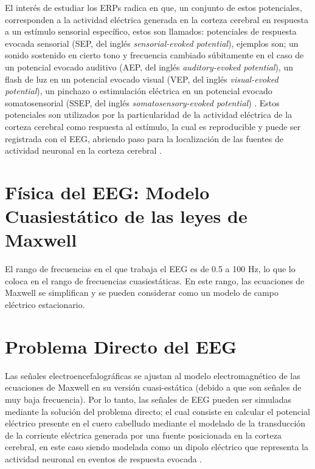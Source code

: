 El interés de estudiar los ERPs radica en que, un conjunto de estos potenciales, corresponden a la actividad eléctrica generada en la corteza cerebral en respuesta a un estímulo sensorial específico, estos son llamados: potenciales de respuesta evocada sensorial (SEP, del inglés \emph{sensorial-evoked potential}), ejemplos son; un sonido sostenido en cierto tono y frecuencia cambiado súbitamente en el caso de un potencial evocado auditivo (AEP, del inglés \emph{auditory-evoked potential}), un flash de luz en un potencial evocado visual (VEP, del inglés \emph{visual-evoked potential}), un pinchazo o estimulación eléctrica en un potencial evocado somatosensorial (SSEP, del inglés \emph{somatosensory-evoked potential}) \cite{kreutzerEncyclopediaClinicalNeuropsychology2011}. Estos potenciales son utilizados por la particularidad de la actividad eléctrica de la corteza cerebral como respuesta al estímulo, la cual es reproducible y puede ser registrada con el EEG, abriendo paso para la localización de las fuentes de actividad neuronal en la corteza cerebral \cite{luckIntroductionEventrelatedPotential2014}. 

\section{Física del EEG: Modelo Cuasiestático de las leyes de Maxwell}

El rango de frecuencias en el que trabaja el EEG es de 0.5 a 100 Hz, lo que lo coloca en el rango de frecuencias cuasiestáticas. En este rango, las ecuaciones de Maxwell se simplifican y se pueden considerar como un modelo de campo eléctrico estacionario. \cite{Hamalainen1993}




\section{Problema Directo del EEG}
\label{sec:methodology:direct}

Las señales electroencefalográficas se ajustan al modelo electromagnético de las ecuaciones de Maxwell en su versión cuasi-estática (debido a que son señales de muy baja frecuencia). Por lo tanto, las señales de EEG pueden ser simuladas mediante la solución del problema directo; el cual consiste en calcular el potencial eléctrico presente en el cuero cabelludo mediante el modelado de la transducción de la corriente eléctrica generada por una fuente posicionada en la corteza cerebral, en este caso siendo modelada como un dipolo eléctrico que representa la actividad neuronal en eventos de respuesta evocada \cite{Mosher1999, Hallez2007}. 

